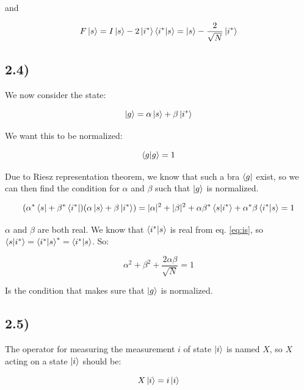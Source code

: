 \documentclass[a4paper,norsk, 10pt]{article}
\begin{document}
and

\begin{equation}
F\ket{s} = I\ket{s} - 2\ket{i^*}\bra{i^*}\ket{s} = \ket{s} - \frac{2}{\sqrt{N}}\ket{i^*}
\label{eq:Fs}
\end{equation}



\subsection{2.4)}

We now consider the state:

\begin{equation}
\ket{g} = \alpha \ket{s} + \beta\ket{i^*}
\end{equation}

We want this to be normalized:

\begin{equation}
\braket{g}{g} = 1
\end{equation}

Due to Riesz representation theorem, we know that such a bra $\bra{g}$ exist, so we can then find the condition for $\alpha$ and $\beta$ such that $\ket{g}$ is normalized.

\begin{equation}
(\alpha^* \bra{s} + \beta^*\bra{i^*})(\alpha \ket{s} + \beta\ket{i^*}) = |\alpha|^2 + |\beta|^2 + \alpha\beta^* \braket{s}{i^*} + \alpha^*\beta \braket{i^*}{s} = 1
\end{equation}

$\alpha$ and $\beta$ are both real. We know that $\braket{i^*}{s}$ is real from eq. \eqref{eq:is}, so $\braket{s}{i^*} = \braket{i^*}{s}^* = \braket{i^*}{s}$. So: 

\begin{equation}
\alpha^2 + \beta^2 + \frac{2\alpha \beta}{\sqrt{N}} = 1
\label{eq:conditionAB}
\end{equation}

Is the condition that makes sure that $\ket{g}$ is normalized.

\subsection{2.5)}

The operator for measuring the measurement $i$ of state $\ket{i}$ is named $X$, so $X$ acting on a state $\ket{i}$ should be:

\begin{equation}
X\ket{i} = i\ket{i}
\end{equation}
\end{document}
